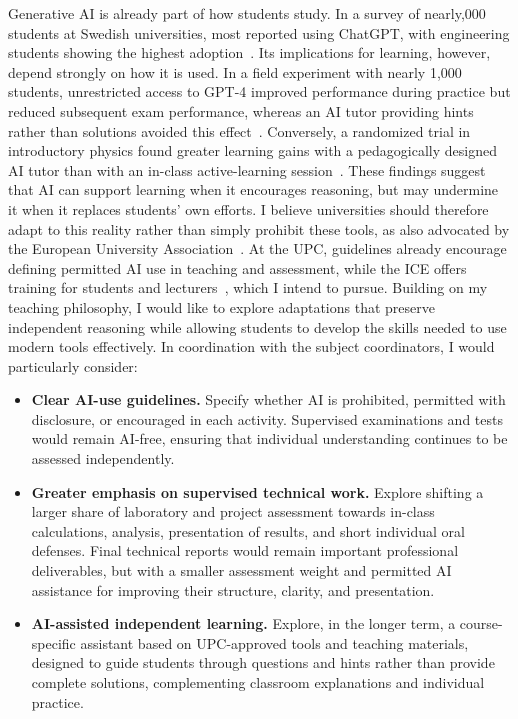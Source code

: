 \documentclass[11pt]{article}
\newcommand{\NEW}[1]{\iffinal #1\else{\color{red}#1}\fi}
\begin{document}
Generative AI is already part of how students study. 
In a survey of \NEW{nearly} 6,000 students at Swedish universities, most reported using ChatGPT, with engineering students showing the highest adoption~\cite{Stohr2024}. 
Its implications for learning, however, depend strongly on how it is used. 
In a field experiment with nearly 1,000 students, unrestricted access to GPT-4 improved performance during practice but reduced subsequent exam performance, whereas an AI tutor providing hints rather than solutions avoided this effect~\cite{Bastani2025}. 
Conversely, a randomized trial in introductory physics found greater learning gains with a pedagogically designed AI tutor than with an in-class active-learning session~\cite{Kestin2025}. 
These findings suggest that AI can support learning when it encourages reasoning, but may undermine it when it replaces students' own efforts.
I believe universities should therefore adapt to this reality rather than simply prohibit these tools, as also advocated by the European University Association~\cite{EUA2023}.
At the UPC, guidelines already encourage defining permitted AI use in teaching and assessment, while the ICE offers training for students and lecturers~\cite{UPCAI2026}, which I intend to pursue.
Building on my teaching philosophy, I would like to explore adaptations that preserve independent reasoning while allowing students to develop the skills needed to use modern tools effectively. 
In coordination with the subject coordinators, I would particularly consider:
\begin{itemize}
	\item \textbf{Clear AI-use guidelines.} Specify whether AI is prohibited, permitted with disclosure, or encouraged in each activity. Supervised examinations and tests would remain AI-free, ensuring that individual understanding continues to be assessed independently.
	
	\item \textbf{Greater emphasis on supervised technical work.} Explore shifting a larger share of laboratory and project assessment towards in-class calculations, analysis, presentation of results, and short individual oral defenses. Final technical reports would remain important professional deliverables, but with a smaller assessment weight and permitted AI assistance for improving their structure, clarity, and presentation.
	
	\item \textbf{AI-assisted independent learning.} Explore, in the longer term, a course-specific assistant based on UPC-approved tools and teaching materials, designed to guide students through questions and hints rather than provide complete solutions, complementing classroom explanations and individual practice.
\end{itemize}
\end{document}
